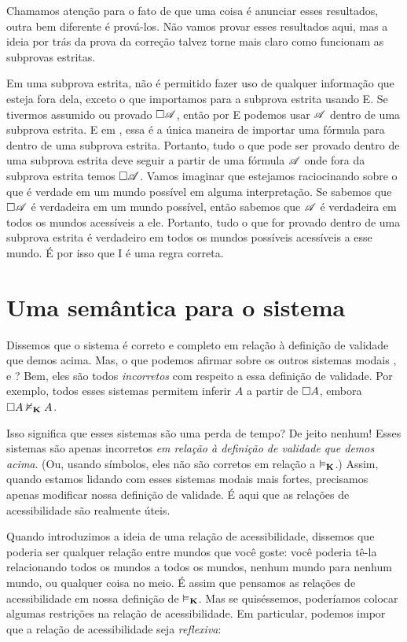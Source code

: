 Chamamos atenção para o fato de que uma coisa é anunciar esses resultados, outra bem diferente é prová-los. Não vamos provar esses resultados aqui, mas a ideia por trás da prova da correção talvez torne mais claro como funcionam as subprovas estritas.

Em uma subprova estrita, não  é permitido fazer uso de qualquer informação que esteja fora dela, exceto o que importamos para a subprova estrita usando  \ebox E. Se tivermos assumido ou provado $\Box \mathscr{A}$, então por \ebox E  podemos usar $\mathscr{A}$ dentro de uma subprova estrita. E em \mlK, essa é a única maneira de importar uma fórmula para dentro de uma subprova estrita. Portanto, tudo o que pode ser provado dentro de uma subprova estrita deve seguir a partir de uma  fórmula  $\mathscr{A}$ onde fora da subprova estrita temos $\Box \mathscr{A}$. Vamos imaginar que estejamos raciocinando sobre o que é verdade em um mundo possível em alguma interpretação. Se sabemos que $\Box\mathscr{A}$ é verdadeira em um mundo possível, então sabemos que $\mathscr{A}$ é verdadeira em todos os mundos acessíveis a ele. Portanto, tudo o que for provado dentro de uma subprova estrita é verdadeiro em todos os mundos possíveis acessíveis a esse mundo. É por isso que \ebox I é uma regra correta.

\section{Uma semântica para o sistema \mlT}
\label{SemanticsT}

Dissemos que o sistema \mlK{} é correto e completo em relação à definição de validade que demos acima. Mas,  o que podemos afirmar sobre os outros sistemas modais \mlT, \mlSfour{}  e \mlSfive  ? Bem, eles são todos  \emph{incorretos} com respeito a essa definição de validade. Por exemplo, todos esses sistemas permitem inferir $A$ a partir de $\Box A$, embora  $\Box A\nvDash_{\mathbf{K}} A$.

Isso significa que esses sistemas são uma perda de tempo? De jeito nenhum! Esses sistemas são apenas incorretos \emph{em relação à definição de validade que demos acima}. (Ou, usando símbolos, eles não são corretos em relação a $\vDash_{\mathbf{K}}$.) Assim, quando estamos lidando com esses sistemas modais mais fortes, precisamos apenas modificar nossa definição de validade. É aqui que as relações de acessibilidade são realmente úteis.

Quando introduzimos a ideia de uma relação de acessibilidade, dissemos que poderia ser qualquer relação entre mundos que você goste: você poderia tê-la relacionando todos os mundos a todos os mundos,  nenhum mundo para nenhum mundo, ou qualquer coisa no meio. É assim que pensamos as relações de acessibilidade em nossa definição de $\vDash_{\mathbf{K}}$. Mas se quiséssemos, poderíamos  colocar algumas restrições na relação de acessibilidade. Em particular, podemos impor que a relação de acessibilidade seja \emph{reflexiva}:

